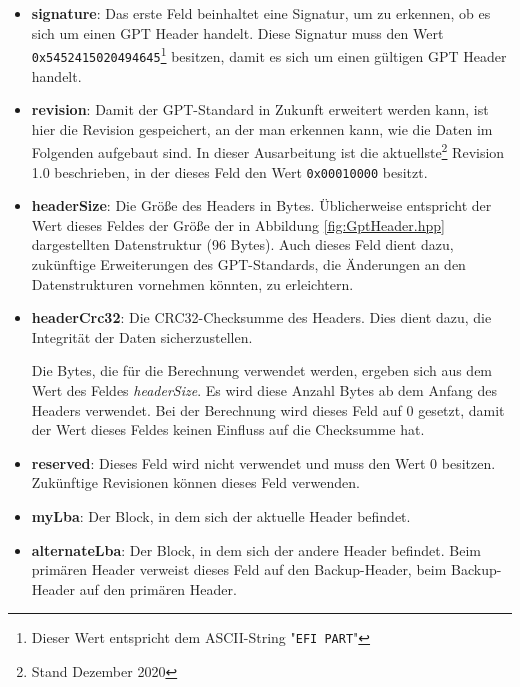 \newpage
\begin{itemize}
    \item \textbf{signature}: 
    Das erste Feld beinhaltet eine Signatur, um zu erkennen, ob es sich um einen GPT Header handelt.
    Diese Signatur muss den Wert \texttt{0x5452415020494645}\footnote{
        Dieser Wert entspricht dem ASCII-String "\texttt{EFI PART}"
    } 
    besitzen, damit es sich um einen gültigen GPT Header handelt.

    \item \textbf{revision}:
    Damit der GPT-Standard in Zukunft erweitert werden kann, ist hier die Revision gespeichert, an der man erkennen kann, wie die Daten im Folgenden aufgebaut sind.
    In dieser Ausarbeitung ist die aktuellste\footnote{
        Stand Dezember 2020
    }
    Revision 1.0 beschrieben, in der dieses Feld den Wert \texttt{0x00010000} besitzt.

    \item \textbf{headerSize}:
    Die Größe des Headers in Bytes.
    Üblicherweise entspricht der Wert dieses Feldes der Größe der in Abbildung \ref{fig:GptHeader.hpp} dargestellten Datenstruktur (96 Bytes).
    Auch dieses Feld dient dazu, zukünftige Erweiterungen des GPT-Standards, die Änderungen an den Datenstrukturen vornehmen könnten, zu erleichtern.

    \newpage
    \item \textbf{headerCrc32}:
    Die CRC32-Checksumme des Headers.
    Dies dient dazu, die Integrität der Daten sicherzustellen.

    Die Bytes, die für die Berechnung verwendet werden, ergeben sich aus dem Wert des Feldes \textit{headerSize}.
    Es wird diese Anzahl Bytes ab dem Anfang des Headers verwendet.
    Bei der Berechnung wird dieses Feld auf 0 gesetzt, damit der Wert dieses Feldes keinen Einfluss auf die Checksumme hat.
     

    \item \textbf{reserved}:
    Dieses Feld wird nicht verwendet und muss den Wert 0 besitzen. Zukünftige Revisionen können dieses Feld verwenden.

    \item \textbf{myLba}:
    Der Block, in dem sich der aktuelle Header befindet.

    \item \textbf{alternateLba}:
    Der Block, in dem sich der andere Header befindet.
    Beim primären Header verweist dieses Feld auf den Backup-Header, beim Backup-Header auf den primären Header.


\end{itemize}
